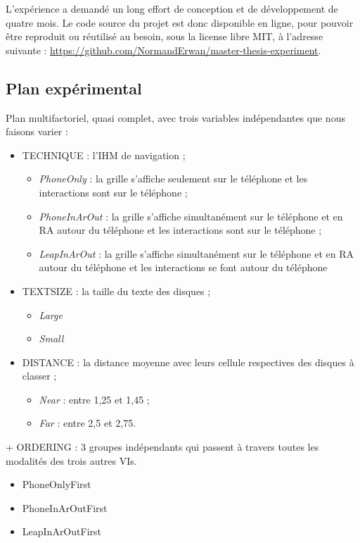 L'expérience a demandé un long effort de conception et de développement de quatre mois. Le code source du projet est donc disponible en ligne, pour pouvoir être reproduit ou réutilisé au besoin, sous la license libre MIT, à l'adresse suivante : \url{https://github.com/NormandErwan/master-thesis-experiment}.

\subsection{Plan expérimental}
Plan multifactoriel, quasi complet, avec trois variables indépendantes que nous faisons varier :
\begin{itemize}
  \item \textsc{TECHNIQUE} : l'IHM de navigation ;
  \begin{itemize}
    \item \textit{PhoneOnly} : la grille s'affiche seulement sur le téléphone et les interactions sont sur le téléphone ;
    \item \textit{PhoneInArOut} : la grille s'affiche simultanément sur le téléphone et en RA autour du téléphone et les interactions sont sur le téléphone ;
    \item \textit{LeapInArOut} : la grille s'affiche simultanément sur le téléphone et en RA autour du téléphone et les interactions se font autour du téléphone
  \end{itemize}
  \item \textsc{TEXTSIZE} : la taille du texte des disques ;
  \begin{itemize}
    \item \textit{Large}
    \item \textit{Small}
  \end{itemize}
  \item \textsc{DISTANCE} : la distance moyenne avec leurs cellule respectives des disques à classer ;
  \begin{itemize}
    \item \textit{Near} : entre 1,25 et 1,45 ;
    \item \textit{Far} : entre 2,5 et 2,75.
  \end{itemize}
\end{itemize}

+ ORDERING : 3 groupes indépendants qui passent à travers toutes les modalités des trois autres VIs.
\begin{itemize}
  \item PhoneOnlyFirst
  \item PhoneInArOutFirst
  \item LeapInArOutFirst
\end{itemize}

